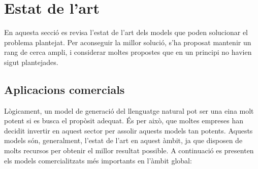 \section{Estat de l'art}
En aquesta secció es revisa l'estat de l'art dels models que poden solucionar el problema plantejat. Per aconseguir la millor solució, s'ha proposat mantenir un rang de cerca ampli, i considerar moltes propostes que en un principi no havien sigut plantejades.
\subsection{Aplicacions comercials}
Lògicament, un model de generació del llenguatge natural pot ser una eina molt potent si es busca el propòsit adequat. És per això, que moltes empreses han decidit invertir en aquest sector per assolir aquests models tan potents. Aquests models són, generalment, l'estat de l'art en aquest àmbit, ja que disposen de molts recursos per obtenir el millor resultat possible. A continuació es presenten els models comercialitzats més importants en l'àmbit global:

